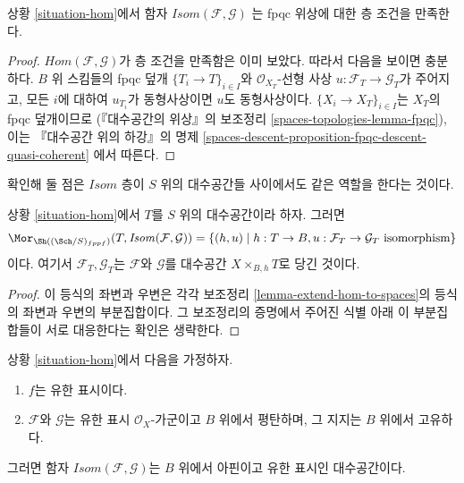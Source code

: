 \begin{lemma}
\label{lemma-isom-sheaf}
상황 \ref{situation-hom}에서 함자
$\mathit{Isom}(\mathcal{F}, \mathcal{G})$ 
는 fpqc 위상에 대한 층 조건을 만족한다.
\end{lemma}

\begin{proof}
 $\mathit{Hom}(\mathcal{F}, \mathcal{G})$가 층 조건을 만족함은
이미 보았다. 따라서 다음을 보이면 충분하다. $B$ 위 스킴들의 fpqc 덮개
$\{T_i \to T\}_{i \in I}$와 $\mathcal{O}_{X_T}$-선형 사상
$u : \mathcal{F}_T \to \mathcal{G}_T$가 주어지고, 모든 $i$에
대하여 $u_{T_i}$가 동형사상이면 $u$도 동형사상이다.
$\{X_i \to X_T\}_{i \in I}$는 $X_T$의 fpqc 덮개이므로
(『대수공간의 위상』의 보조정리
\ref{spaces-topologies-lemma-fpqc}),
이는 『대수공간 위의 하강』의 명제
\ref{spaces-descent-proposition-fpqc-descent-quasi-coherent}
에서 따른다.
\end{proof}

\noindent
확인해 둘 점은 $\mathit{Isom}$ 층이 $S$ 위의 대수공간들 사이에서도
같은 역할을 한다는 것이다.

\begin{lemma}
\label{lemma-extend-isom-to-spaces}
상황 \ref{situation-hom}에서 $T$를 $S$ 위의 대수공간이라 하자.
그러면
$$
\Mor_{\Sh((\Sch/S)_{fppf})}(T, \mathit{Isom}(\mathcal{F}, \mathcal{G})) =
\{(h, u) \mid
h : T \to B, u : \mathcal{F}_T \to \mathcal{G}_T\text{ isomorphism}\}
$$
이다. 여기서 $\mathcal{F}_T, \mathcal{G}_T$는
$\mathcal{F}$와 $\mathcal{G}$를 대수공간
$X \times_{B, h} T$로 당긴 것이다.
\end{lemma}

\begin{proof}
이 등식의 좌변과 우변은 각각 보조정리
\ref{lemma-extend-hom-to-spaces}의 등식의 좌변과 우변의 부분집합이다.
그 보조정리의 증명에서 주어진 식별 아래 이 부분집합들이 서로
대응한다는 확인은 생략한다.
\end{proof}

\begin{proposition}
\label{proposition-isom}
상황 \ref{situation-hom}에서 다음을 가정하자.
\begin{enumerate}
\item $f$는 유한 표시이다.
\item $\mathcal{F}$와 $\mathcal{G}$는 유한 표시
$\mathcal{O}_X$-가군이고 $B$ 위에서 평탄하며, 그 지지는
$B$ 위에서 고유하다.
\end{enumerate}
그러면 함자 $\mathit{Isom}(\mathcal{F}, \mathcal{G})$는
$B$ 위에서 아핀이고 유한 표시인 대수공간이다.
\end{proposition}

